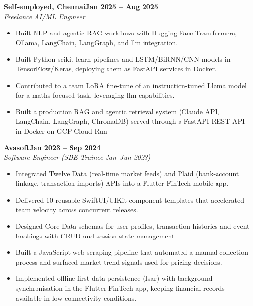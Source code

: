 \documentclass[a4paper,11pt]{article}
\newcommand{\entry}[4]{\needspace{4\baselineskip}\noindent\textbf{#1}\hfill\textbf{#2}\\ \textit{#3}\hfill\textit{#4}\par}
\begin{document}
\vspace{4pt}
\entry{Self-employed, Chennai}{Jan 2025 – Aug 2025}{Freelance AI/ML Engineer}{}
\begin{itemize}
  \item Built NLP and agentic RAG workflows with Hugging Face Transformers, Ollama, LangChain, LangGraph, and llm integration.
  \item Built Python scikit-learn pipelines and LSTM/BiRNN/CNN models in TensorFlow/Keras, deploying them as FastAPI services in Docker.
  \item Contributed to a team LoRA fine-tune of an instruction-tuned Llama model for a maths-focused task, leveraging llm capabilities.
  \item Built a production RAG and agentic retrieval system (Claude API, LangChain, LangGraph, ChromaDB) served through a FastAPI REST API in Docker on GCP Cloud Run.
\end{itemize}
\vspace{4pt}
\entry{Avasoft}{Jan 2023 – Sep 2024}{Software Engineer (SDE Trainee Jan–Jun 2023)}{}
\begin{itemize}
  \item Integrated Twelve Data (real-time market feeds) and Plaid (bank-account linkage, transaction imports) APIs into a Flutter FinTech mobile app.
  \item Delivered 10 reusable SwiftUI/UIKit component templates that accelerated team velocity across concurrent releases.
  \item Designed Core Data schemas for user profiles, transaction histories and event bookings with CRUD and session-state management.
  \item Built a JavaScript web-scraping pipeline that automated a manual collection process and surfaced market-trend signals used for pricing decisions.
  \item Implemented offline-first data persistence (Isar) with background synchronisation in the Flutter FinTech app, keeping financial records available in low-connectivity conditions.
\end{itemize}

\end{document}
